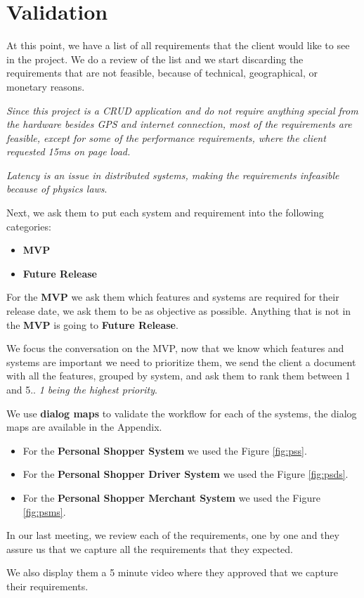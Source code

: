\section{Validation }
At this point, we have a list of all requirements that the client would like to see in the project. We do a review of the list and we start discarding the requirements that are not feasible, because of technical, geographical, or monetary reasons.\newline

\noindent \textit{Since this project is a CRUD application \cite{crud} and do 
not require anything special from the hardware besides GPS and internet 
connection, most of the requirements are feasible, except for 
some of the performance requirements, where the client 
requested 15ms on page load.}\newline

\noindent \textit{Latency is an issue in distributed systems, making the 
requirements infeasible because of physics laws}. \newline

\noindent Next, we ask them to put each system and requirement into the 
following categories:
\begin{itemize}
    \item \textbf{MVP} \cite{mvp}
    \item \textbf{Future Release}
\end{itemize}

\noindent For the \textbf{MVP} we ask them which features and systems are 
required for their release date, we ask them to be as objective as possible. 
Anything that is not in the \textbf{MVP} is going to 
\textbf{Future Release}. \newline

\noindent We focus the conversation on the MVP, now that we know which 
features and systems are important we need to prioritize them,  we send the 
client a document with all the features, grouped by system, and ask them to 
rank them between 1 and 5.. \textit{1 being the highest priority}. \newline

\noindent We use \textbf{dialog maps} to validate the workflow for each of 
the systems, the dialog maps are available in the Appendix. 
\begin{itemize}
    \item For the \textbf{Personal Shopper System} we used 
    the Figure \ref{fig:pss}. 
    \item For the \textbf{Personal Shopper Driver System} we used 
    the Figure \ref{fig:psds}. 
    \item For the \textbf{Personal Shopper Merchant System} we used 
    the Figure \ref{fig:psms}. 
\end{itemize}

\noindent In our last meeting, we review each of the requirements, one by one 
and they assure us that we capture all the requirements that they 
expected.  \linebreak

\noindent We also display them a 5 minute video where they approved that we 
capture their requirements.